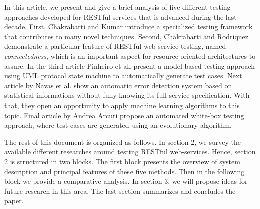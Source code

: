 \documentclass[english]{tktltiki}
\begin{document}
In this article, we present and give a brief analysis of five different testing approaches developed for RESTful services that is advanced during the last decade. First, Chakrabarti and Kumar \cite{chakrabarti2009test} introduce a specialized testing framework that contributes to many novel techniques. Second, Chakrabarti and Rodriquez \cite{chakrabarti2010connectedness} demonstrate a particular feature of RESTful web-service testing, named \textit{connectedness}, which is an important aspect for resource oriented architectures to assure. In the third article Pinheiro et al. \cite{pinheiro2013model} present a model-based testing approach using UML protocol state machine to automatically generate test cases. Next article by Navas et al. \cite{navas2014rest} show an automatic error detection system based on statistical informations without fully knowing its full service specification. With that, they open an opportunity to apply machine learning algorithms to this topic. Final article by Andrea Arcuri \cite{arcuri2017restful} propose an automated white-box testing approach, where test cases are generated using an evolutionary algorithm.

The rest of this document is organized as follows. In section 2, we survey the available different researches around testing RESTful web-services. Hence, section 2 is structured in two blocks. The first block presents the overview of system description and principal features of these five methods. Then in the following block we provide a comparative analysis. In section 3, we will propose ideas for future research in this area. The last section summarizes and concludes the paper.

\end{document}
